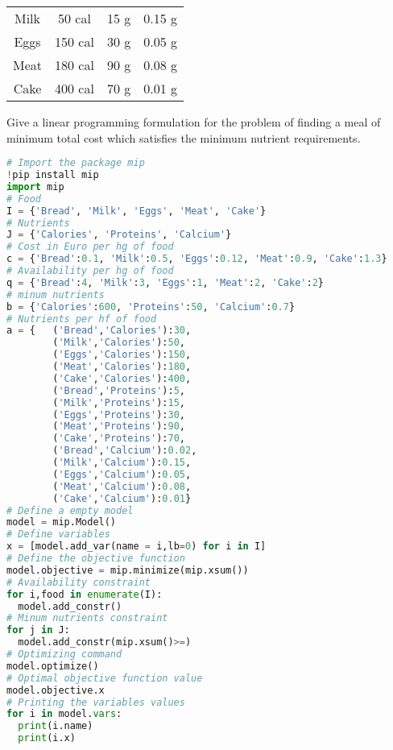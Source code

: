 \documentclass[12pt, a4paper]{report}
\newtheorem[style=M,bodystyle=\normalfont]{theorem}{Theorem}
\newtheorem[style=M,bodystyle=\normalfont]{corollary}{Corollary}
\newtheorem[style=M,bodystyle=\normalfont]{lemma}{Lemma}
\newtheorem[style=M,bodystyle=\normalfont]{definition}{Definition}
\begin{document}
\begin{Exercise}[label=1]
\begin{table}[H]
\begin{tabular}{|cccc|}
        \multicolumn{1}{|c|}{Milk}  & \multicolumn{1}{c|}{50 cal}  & \multicolumn{1}{c|}{15 g} & 0.15 g           \\
        \multicolumn{1}{|c|}{Eggs}  & \multicolumn{1}{c|}{150 cal} & \multicolumn{1}{c|}{30 g} & 0.05 g           \\
        \multicolumn{1}{|c|}{Meat}  & \multicolumn{1}{c|}{180 cal} & \multicolumn{1}{c|}{90 g} & 0.08 g           \\
        \multicolumn{1}{|c|}{Cake}  & \multicolumn{1}{c|}{400 cal} & \multicolumn{1}{c|}{70 g} & 0.01 g           \\ \hline
        \end{tabular}
    \end{table}
    Give a linear programming formulation for the problem of finding a meal of minimum total cost which satisfies the minimum nutrient requirements.
\end{Exercise}
\begin{Answer}[ref=1]
    \begin{lstlisting}[language=Python]
# Import the package mip
!pip install mip
import mip
# Food
I = {'Bread', 'Milk', 'Eggs', 'Meat', 'Cake'}
# Nutrients
J = {'Calories', 'Proteins', 'Calcium'}
# Cost in Euro per hg of food
c = {'Bread':0.1, 'Milk':0.5, 'Eggs':0.12, 'Meat':0.9, 'Cake':1.3}
# Availability per hg of food
q = {'Bread':4, 'Milk':3, 'Eggs':1, 'Meat':2, 'Cake':2}
# minum nutrients 
b = {'Calories':600, 'Proteins':50, 'Calcium':0.7}
# Nutrients per hf of food
a = {   ('Bread','Calories'):30,
        ('Milk','Calories'):50,
        ('Eggs','Calories'):150,
        ('Meat','Calories'):180,
        ('Cake','Calories'):400,
        ('Bread','Proteins'):5,
        ('Milk','Proteins'):15,
        ('Eggs','Proteins'):30,
        ('Meat','Proteins'):90,
        ('Cake','Proteins'):70,
        ('Bread','Calcium'):0.02,
        ('Milk','Calcium'):0.15,
        ('Eggs','Calcium'):0.05,
        ('Meat','Calcium'):0.08,
        ('Cake','Calcium'):0.01}
# Define a empty model
model = mip.Model()
# Define variables
x = [model.add_var(name = i,lb=0) for i in I]
# Define the objective function
model.objective = mip.minimize(mip.xsum())
# Availability constraint
for i,food in enumerate(I):
  model.add_constr()
# Minum nutrients constraint
for j in J:
  model.add_constr(mip.xsum()>=)
# Optimizing command
model.optimize()
# Optimal objective function value
model.objective.x
# Printing the variables values
for i in model.vars:
  print(i.name)
  print(i.x)
    \end{lstlisting}
\end{Answer}

\newpage
\end{document}
